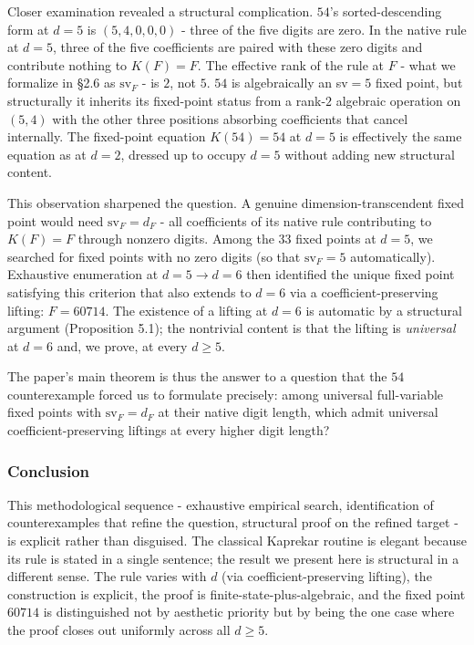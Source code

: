 \documentclass[11pt,letterpaper]{article}
\theoremstyle{paperstyle}
\theoremstyle{paperstyledef}
\theoremstyle{paperstylerem}
\begin{document}
Closer examination revealed a structural complication. \(54\)'s
sorted-descending form at \(d = 5\) is \((5, 4, 0, 0, 0)\) - three of
the five digits are zero. In the native rule at \(d = 5\), three of the
five coefficients are paired with these zero digits and contribute
nothing to \(K(F) = F\). The effective rank of the rule at \(F\) -
what we formalize in §2.6 as \(\mathrm{sv}_F\) - is \(2\), not \(5\).
\(54\) is algebraically an sv\(=5\) fixed point, but structurally it
inherits its fixed-point status from a rank-\(2\) algebraic operation on
\((5, 4)\) with the other three positions absorbing coefficients that
cancel internally. The fixed-point equation \(K(54) = 54\) at \(d = 5\)
is effectively the same equation as at \(d = 2\), dressed up to occupy
\(d = 5\) without adding new structural content.

This observation sharpened the question. A genuine
dimension-transcendent fixed point would need \(\mathrm{sv}_F = d_F\) - all coefficients of its native rule contributing to \(K(F) = F\)
through nonzero digits. Among the \(33\) fixed points at \(d = 5\), we
searched for fixed points with no zero digits (so that
\(\mathrm{sv}_F = 5\) automatically). Exhaustive enumeration at
\(d = 5 \to d = 6\) then identified the unique fixed point satisfying
this criterion that also extends to \(d = 6\) via a
coefficient-preserving lifting: \(F = 60714\). The existence of a
lifting at \(d = 6\) is automatic by a structural argument (Proposition
5.1); the nontrivial content is that the lifting is \emph{universal} at
\(d = 6\) and, we prove, at every \(d \geq 5\).

The paper's main theorem is thus the answer to a question that the
\(54\) counterexample forced us to formulate precisely: among universal
full-variable fixed points with \(\mathrm{sv}_F = d_F\) at their native
digit length, which admit universal coefficient-preserving liftings at
every higher digit length?

\hypertarget{conclusion}{%
\subsubsection{Conclusion}\label{conclusion}}

This methodological sequence - exhaustive empirical search,
identification of counterexamples that refine the question, structural
proof on the refined target - is explicit rather than disguised. The
classical Kaprekar routine is elegant because its rule is stated in a
single sentence; the result we present here is structural in a different
sense. The rule varies with \(d\) (via coefficient-preserving lifting),
the construction is explicit, the proof is finite-state-plus-algebraic,
and the fixed point \(60714\) is distinguished not by aesthetic priority
but by being the one case where the proof closes out uniformly across
all \(d \geq 5\).
\end{document}
